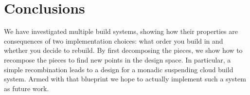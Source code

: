 \section{Conclusions}\label{sec-conclusions}

We have investigated multiple build systems, showing how their properties are consequences of two implementation choices: what order you build in and whether you decide to rebuild. By first decomposing the pieces, we show how to recompose the pieces to find new points in the design space. In particular, a simple recombination leads to a design for a monadic suspending cloud build system. Armed with that blueprint we hope to actually implement such a system as future work.

